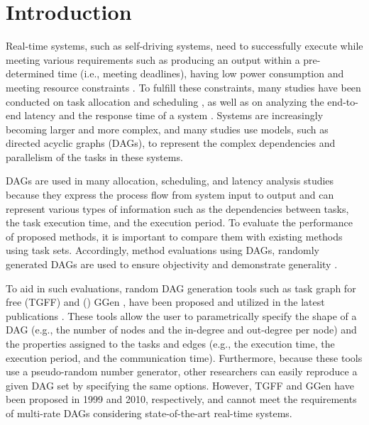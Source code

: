\section{Introduction}
\label{sec: introduction}

Real-time systems, such as self-driving systems, need to successfully execute while meeting various requirements such as producing an output within a pre-determined time (i.e., meeting deadlines), having low power consumption and meeting resource constraints \cite{koike2021federated, senapati2021hmds, kaur2020deep}.
To fulfill these constraints, many studies have been conducted on task allocation and scheduling \cite{igarashi2021accurate, asghari2020online, tong2020ql}, as well as on analyzing the end-to-end latency and the response time of a system \cite{yang2020exploring, kordon2020evaluation, chen2021partial}.
Systems are increasingly becoming larger and more complex, and many studies use models, such as directed acyclic graphs (DAGs), to represent the complex dependencies and parallelism of the tasks in these systems.

DAGs are used in many allocation, scheduling, and latency analysis studies \cite{choi2021picas, nguyen2019cache, klaus2021constrained} because they express the process flow from system input to output and can represent various types of information such as the dependencies between tasks, the task execution time, and the execution period.
To evaluate the performance of proposed methods, it is important to compare them with existing methods using task sets.
Accordingly, method evaluations using DAGs, randomly generated DAGs are used to ensure objectivity and demonstrate generality \cite{he2021response, verucchi2020latency, senapati2021hmds}.

To aid in such evaluations, random DAG generation tools such as task graph for free (TGFF) \cite{tgff} and () GGen \cite{cordeiro2010random}, have been proposed and utilized in the latest publications \cite{sun2021deepweave, huang2020hda, rouxel-free, cao2018affinity}.
These tools allow the user to parametrically specify the shape of a DAG (e.g., the number of nodes and the in-degree and out-degree per node) and the properties assigned to the tasks and edges (e.g., the execution time, the execution period, and the communication time).
Furthermore, because these tools use a pseudo-random number generator, other researchers can easily reproduce a given DAG set by specifying the same options.
However, TGFF and GGen have been proposed in 1999 and 2010, respectively, and cannot meet the requirements of multi-rate DAGs considering state-of-the-art real-time systems.

